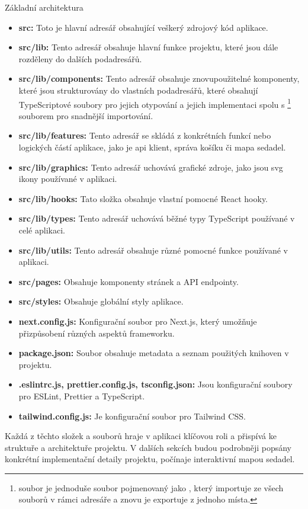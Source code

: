 \begin{subsection}{Základní architektura}
    \begin{itemize}
        \item \textbf{src:} Toto je hlavní adresář obsahující veškerý zdrojový kód aplikace.
        \item \textbf{src/lib:} Tento adresář obsahuje hlavní funkce projektu, které jsou dále rozděleny do dalších podadresářů.
        \item \textbf{src/lib/components:} Tento adresář obsahuje znovupoužitelné komponenty, které jsou strukturovány do vlastních podadresářů, které obsahují TypeScriptové soubory pro jejich otypování a jejich implementaci spolu s \footnote{ soubor je jednoduše soubor pojmenovaný jako , který importuje ze všech souborů v rámci adresáře a znovu je exportuje z jednoho místa.} souborem pro snadnější importování.
        \item \textbf{src/lib/features:} Tento adresář se skládá z konkrétních funkcí nebo logických částí aplikace, jako je \ac{api} klient, správa košíku či mapa sedadel.
        \item \textbf{src/lib/graphics:} Tento adresář uchovává grafické zdroje, jako jsou \ac{svg} ikony používané v aplikaci.
        \item \textbf{src/lib/hooks:} Tato složka obsahuje vlastní pomocné React hooky.
        \item \textbf{src/lib/types:} Tento adresář uchovává běžné typy TypeScript používané v celé aplikaci.
        \item \textbf{src/lib/utils:} Tento adresář obsahuje různé pomocné funkce používané v aplikaci.
        \item \textbf{src/pages:} Obsahuje komponenty stránek a \ac{API} endpointy.
        \item \textbf{src/styles:} Obsahuje globální styly aplikace.
        \item \textbf{next.config.js:} Konfigurační soubor pro Next.js, který umožňuje přizpůsobení různých aspektů frameworku.
        \item \textbf{package.json:} Soubor obsahuje metadata a seznam použitých knihoven v projektu.
        \item \textbf{.eslintrc.js, prettier.config.js, tsconfig.json:} Jsou konfigurační soubory pro ESLint, Prettier a TypeScript.
        \item \textbf{tailwind.config.js:} Je konfigurační soubor pro Tailwind CSS\@.
    \end{itemize}

    Každá z těchto složek a souborů hraje v aplikaci klíčovou roli a přispívá ke struktuře a architektuře projektu.
    V dalších sekcích budou podrobněji popsány konkrétní implementační detaily projektu, počínaje interaktivní mapou sedadel.
\end{subsection}
